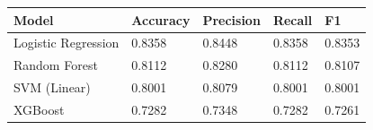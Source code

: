 \begin{tabular}{lllll}
\toprule
Model & Accuracy & Precision & Recall & F1 \\
\midrule
Logistic Regression & 0.8358 & 0.8448 & 0.8358 & 0.8353 \\
Random Forest & 0.8112 & 0.8280 & 0.8112 & 0.8107 \\
SVM (Linear) & 0.8001 & 0.8079 & 0.8001 & 0.8001 \\
XGBoost & 0.7282 & 0.7348 & 0.7282 & 0.7261 \\
\bottomrule
\end{tabular}
